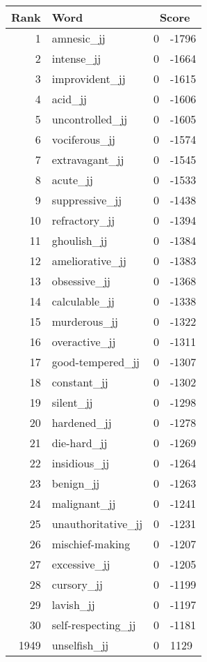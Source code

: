 \begin{longtable}[!htbp]{| rlr@{.}l |}
    \hline
    \textbf{Rank} & \textbf{Word} & \multicolumn{2}{c|}{\textbf{Score}} \\
    \hline
    \endhead
    1 & amnesic\_jj & 0 & -1796 \\
    2 & intense\_jj & 0 & -1664 \\
    3 & improvident\_jj & 0 & -1615 \\
    4 & acid\_jj & 0 & -1606 \\
    5 & uncontrolled\_jj & 0 & -1605 \\
    6 & vociferous\_jj & 0 & -1574 \\
    7 & extravagant\_jj & 0 & -1545 \\
    8 & acute\_jj & 0 & -1533 \\
    9 & suppressive\_jj & 0 & -1438 \\
    10 & refractory\_jj & 0 & -1394 \\
    11 & ghoulish\_jj & 0 & -1384 \\
    12 & ameliorative\_jj & 0 & -1383 \\
    13 & obsessive\_jj & 0 & -1368 \\
    14 & calculable\_jj & 0 & -1338 \\
    15 & murderous\_jj & 0 & -1322 \\
    16 & overactive\_jj & 0 & -1311 \\
    17 & good-tempered\_jj & 0 & -1307 \\
    18 & constant\_jj & 0 & -1302 \\
    19 & silent\_jj & 0 & -1298 \\
    20 & hardened\_jj & 0 & -1278 \\
    21 & die-hard\_jj & 0 & -1269 \\
    22 & insidious\_jj & 0 & -1264 \\
    23 & benign\_jj & 0 & -1263 \\
    24 & malignant\_jj & 0 & -1241 \\
    25 & unauthoritative\_jj & 0 & -1231 \\
    26 & mischief-making & 0 & -1207 \\
    27 & excessive\_jj & 0 & -1205 \\
    28 & cursory\_jj & 0 & -1199 \\
    29 & lavish\_jj & 0 & -1197 \\
    30 & self-respecting\_jj & 0 & -1181 \\
    1949 & unselfish\_jj & 0 & 1129 \\

\end{longtable}
